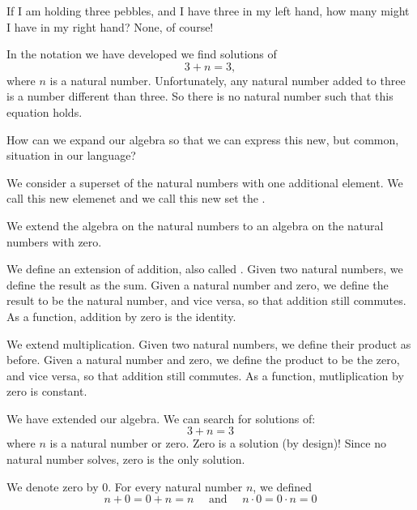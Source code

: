 \sbasic


\sstart



If I am holding
three pebbles, and I have three
in my left hand, how many
might I have in my right hand?
None, of course!

In the notation we have developed
we find solutions of
\[
  3 + n = 3,
\]
where $n$ is a natural number.
Unfortunately, any natural number
added to three is a number different
than three.
So there is no natural number
such that this equation holds.

How can we expand our algebra
so that we can express this
new, but common, situation in
our language?


We consider a superset
of the natural numbers with
one additional element.
We call this new elemenet
and we call this new set
the
.


We extend the algebra on
the natural numbers to an
algebra on the natural numbers
with zero.

We define an extension of addition,
also called
.
Given two natural
numbers, we define the
result as the sum.
Given a natural number
and zero,
we define the result
to be the natural number,
and vice versa,
so that addition
still commutes.
As a function, addition
by zero is the identity.

We extend multiplication.
Given two natural
numbers, we define their
product as before.
Given a natural number
and zero,
we define the product
to be the zero,
and vice versa,
so that addition
still commutes.
As a function, mutliplication
by zero is constant.


We have extended our algebra.
We can search for solutions of:
\[
  3 + n = 3
\]
where $n$ is a natural
number or zero.
Zero is a solution (by design)!
Since no natural number
solves, zero is
the only solution.


We denote zero by $0$.
For every natural number
$n$, we defined
\[
  n + 0 = 0 + n = n \quad \text{ and } \quad n \cdot 0 = 0 \cdot n = 0
\]

\strats
